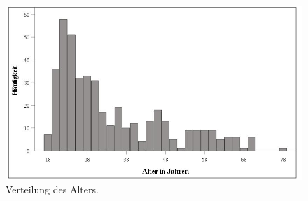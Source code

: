 \begin{figure}[htb]
    \centering
        \includegraphics[width=0.8\linewidth]{Histogramm Alter.jpg}
        \caption[Histogramm Altersverteilung]{Verteilung des Alters.}
        \label{Histogramm Altersverteilung}
\end{figure}

